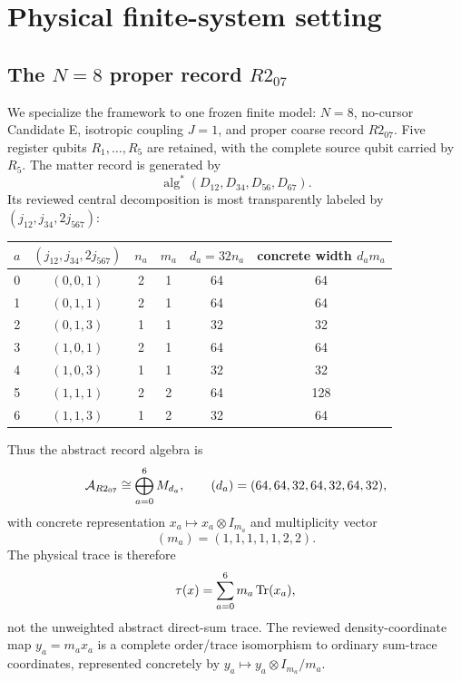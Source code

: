 \section{Physical finite-system setting}
\label{sec:physical}

\subsection{\texorpdfstring{The $N=8$ proper record $R2_{07}$}{The N=8 proper record R2-07}}

We specialize the framework to one frozen finite model: $N=8$, no-cursor Candidate E, isotropic coupling $J=1$, and proper coarse record $R2_{07}$.  Five register qubits $R_1,\ldots,R_5$ are retained, with the complete source qubit carried by $R_5$.  The matter record is generated by
\begin{equation}
\operatorname{alg}^*(D_{12},D_{34},D_{56},D_{67}).
\end{equation}
Its reviewed central decomposition is most transparently labeled by $(j_{12},j_{34},2j_{567})$:
\begin{center}
\begin{tabular}{c c c c c c}
\toprule
$a$ & $(j_{12},j_{34},2j_{567})$ & $n_a$ & $m_a$ & $d_a=32n_a$ & concrete width $d_am_a$\\
\midrule
0 & $(0,0,1)$ & 2 & 1 & 64 & 64\\
1 & $(0,1,1)$ & 2 & 1 & 64 & 64\\
2 & $(0,1,3)$ & 1 & 1 & 32 & 32\\
3 & $(1,0,1)$ & 2 & 1 & 64 & 64\\
4 & $(1,0,3)$ & 1 & 1 & 32 & 32\\
5 & $(1,1,1)$ & 2 & 2 & 64 & 128\\
6 & $(1,1,3)$ & 1 & 2 & 32 & 64\\
\bottomrule
\end{tabular}
\end{center}
Thus the abstract record algebra is
\begin{equation}
\mathcal A_{R2_{07}}
\cong \bigoplus_{a=0}^{6}M_{d_a},
\qquad
(d_a)=(64,64,32,64,32,64,32),
\label{eq:record-algebra}
\end{equation}
with concrete representation $x_a\mapsto x_a\otimes I_{m_a}$ and multiplicity vector
\begin{equation}
(m_a)=(1,1,1,1,1,2,2).
\end{equation}
The physical trace is therefore
\begin{equation}
\tau(x)=\sum_{a=0}^6 m_a\operatorname{Tr}(x_a),
\label{eq:physical-trace}
\end{equation}
not the unweighted abstract direct-sum trace.  The reviewed density-coordinate map $y_a=m_ax_a$ is a complete order/trace isomorphism to ordinary sum-trace coordinates, represented concretely by $y_a\mapsto y_a\otimes I_{m_a}/m_a$.

